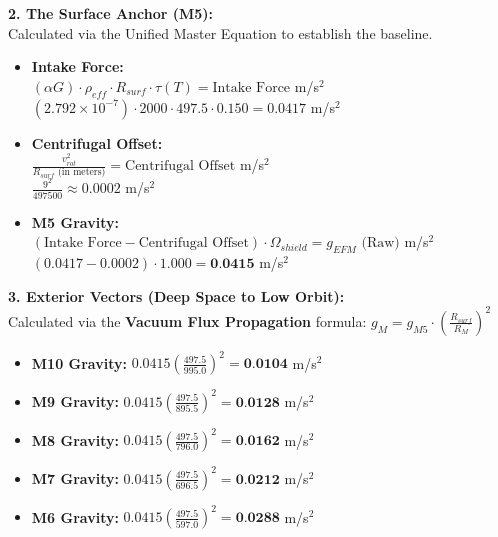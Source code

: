 \documentclass[11pt, a4paper]{article}
\begin{document}
  \vspace{1.0em}
  \noindent \textbf{2. The Surface Anchor (M5):} \\
  \hspace*{1em} Calculated via the Unified Master Equation to establish the baseline.
  \begin{itemize}
    \item \textbf{Intake Force:} \\[0.5em]
    \hspace*{2em} $(\alpha G) \cdot \rho_{eff} \cdot R_{surf} \cdot \tau(T) = \text{Intake Force}$ m/s$^2$ \\[1em]
    \hspace*{2em} $(2.792 \times 10^{-7}) \cdot 2000 \cdot 497.5 \cdot 0.150 = 0.0417$ m/s$^2$
    
    \item \textbf{Centrifugal Offset:} \\[0.5em]
    \hspace*{2em} $\frac{v_{rot}^2}{R_{surf} \text{ (in meters)}} = \text{Centrifugal Offset}$ m/s$^2$ \\[1em]
    \hspace*{2em} $\frac{9^2}{497500} \approx 0.0002$ m/s$^2$
    
    \item \textbf{M5 Gravity:} \\[0.5em]
    \hspace*{2em} $(\text{Intake Force} - \text{Centrifugal Offset}) \cdot \Omega_{shield} = g_{EFM} \text{ (Raw)}$ m/s$^2$ \\[1em]
    \hspace*{2em} $(0.0417 - 0.0002) \cdot 1.000 = \textbf{0.0415}$ m/s$^2$
  \end{itemize}

  \clearpage
  \noindent \textbf{3. Exterior Vectors (Deep Space to Low Orbit):} \\
  \hspace*{1em} Calculated via the \textbf{Vacuum Flux Propagation} formula: $g_M = g_{M5} \cdot \left( \frac{R_{surf}}{R_M} \right)^2$
  \begin{itemize}
    \item \textbf{M10 Gravity:} $0.0415 \left( \frac{497.5}{995.0} \right)^2 = \textbf{0.0104}$ m/s$^2$
    \item \textbf{M9 Gravity:} $0.0415 \left( \frac{497.5}{895.5} \right)^2 = \textbf{0.0128}$ m/s$^2$
    \item \textbf{M8 Gravity:} $0.0415 \left( \frac{497.5}{796.0} \right)^2 = \textbf{0.0162}$ m/s$^2$
    \item \textbf{M7 Gravity:} $0.0415 \left( \frac{497.5}{696.5} \right)^2 = \textbf{0.0212}$ m/s$^2$
    \item \textbf{M6 Gravity:} $0.0415 \left( \frac{497.5}{597.0} \right)^2 = \textbf{0.0288}$ m/s$^2$
  \end{itemize}
\end{document}
